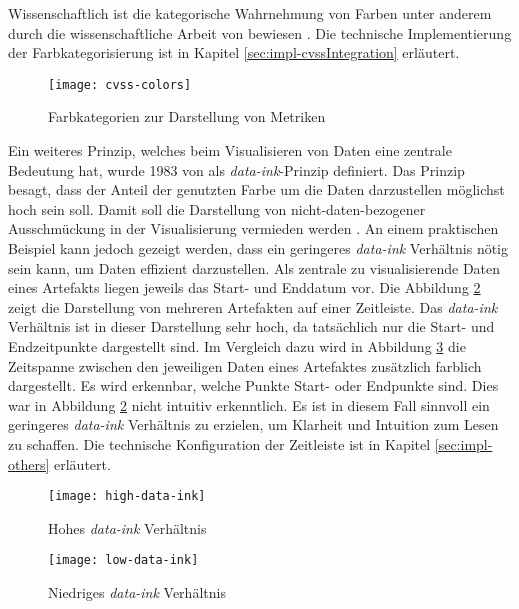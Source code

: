 Wissenschaftlich ist die kategorische Wahrnehmung von Farben unter anderem durch die wissenschaftliche Arbeit von \citeauthor{cliffordColorCategoriesAffect2010} bewiesen \autocite{cliffordColorCategoriesAffect2010}. Die technische Implementierung der Farbkategorisierung ist in Kapitel \ref{sec:impl-cvssIntegration} erläutert.
%
\begin{figure}
    \centering
    \texttt{[image: cvss-colors]}
    \caption{Farbkategorien zur Darstellung von Metriken}
    \label{fig:cvss-colors}
\end{figure}
%
\par Ein weiteres Prinzip, welches beim Visualisieren von Daten eine zentrale Bedeutung hat, wurde 1983 von \citeauthor{tufteBookReviewsVisual1984} als \textit{data-ink}-Prinzip definiert. Das Prinzip besagt, dass der Anteil der genutzten Farbe um die Daten darzustellen möglichst hoch sein soll. Damit soll die Darstellung von nicht-daten-bezogener Ausschmückung in der Visualisierung vermieden werden \autocite{tufteBookReviewsVisual1984}. An einem praktischen Beispiel kann jedoch gezeigt werden, dass ein geringeres \textit{data-ink} Verhältnis nötig sein kann, um Daten effizient darzustellen. Als zentrale zu visualisierende Daten eines Artefakts liegen jeweils das Start- und Enddatum vor. Die Abbildung \ref{fig:high-data-ink} zeigt die Darstellung von mehreren Artefakten auf einer Zeitleiste. Das \textit{data-ink} Verhältnis ist in dieser Darstellung sehr hoch, da tatsächlich nur die Start- und Endzeitpunkte dargestellt sind. Im Vergleich dazu wird in Abbildung \ref{fig:low-data-ink} die Zeitspanne zwischen den jeweiligen Daten eines Artefaktes zusätzlich farblich dargestellt. Es wird erkennbar, welche Punkte Start- oder Endpunkte sind. Dies war in Abbildung \ref{fig:high-data-ink} nicht intuitiv erkenntlich. Es ist in diesem Fall sinnvoll ein geringeres \textit{data-ink} Verhältnis zu erzielen, um Klarheit und Intuition zum Lesen zu schaffen. Die technische Konfiguration der Zeitleiste ist in Kapitel \ref{sec:impl-others} erläutert.
%
\begin{figure}
    \centering
    \texttt{[image: high-data-ink]}
    \caption{Hohes \textit{data-ink} Verhältnis}
    \label{fig:high-data-ink}
\end{figure}
%
\begin{figure}
    \centering
    \texttt{[image: low-data-ink]}
    \caption{Niedriges \textit{data-ink} Verhältnis}
    \label{fig:low-data-ink}
\end{figure}
